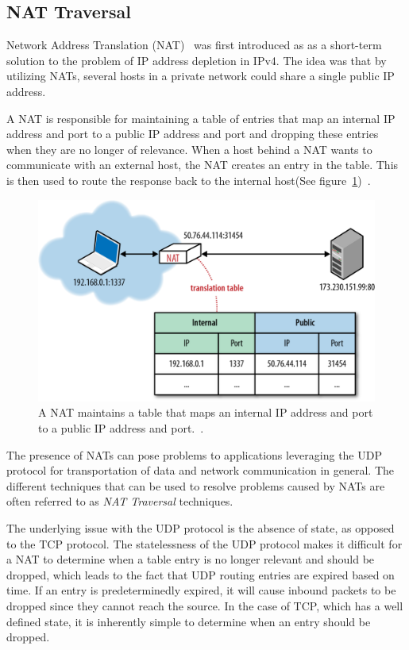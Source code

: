 \subsection{NAT Traversal}
\label{subsec:nattraversal}
Network Address Translation (NAT)~\cite{RFC1631:Online} was first introduced as as a short-term solution to the problem of IP address depletion in IPv4. The idea was that by utilizing NATs, several hosts in a private network could share a single public IP address.

A NAT is responsible for maintaining a table of entries that map an internal IP address and port to a public IP address and port and dropping these entries when they are no longer of relevance. When a host behind a NAT wants to communicate with an external host, the NAT creates an entry in the table. This is then used to route the response back to the internal host(See figure~\ref{fig:NAT})~\cite{RFC5245:Online}.

\begin{figure}[htp]
\centering
\includegraphics[width=\textwidth,height=0.2\paperheight,keepaspectratio
]{figures/nat}
\caption{A NAT maintains a table that maps an internal IP address and port to a public IP address and port.~\cite{NATIllustration:Online}.}
\label{fig:NAT}
\end{figure}

The presence of NATs can pose problems to applications leveraging the UDP protocol for transportation of data and network communication in general. The different techniques that can be used to resolve problems caused by NATs are often referred to as \emph{NAT Traversal} techniques.

The underlying issue with the UDP protocol is the absence of state, as opposed to the TCP protocol. The statelessness of the UDP protocol makes it difficult for a NAT to determine when a table entry is no longer relevant and should be dropped, which leads to the fact that UDP routing entries are expired based on time. If an entry is predeterminedly expired, it will cause inbound packets to be dropped since they cannot reach the source. In the case of TCP, which has a well defined state, it is inherently simple to determine when an entry should be dropped.

